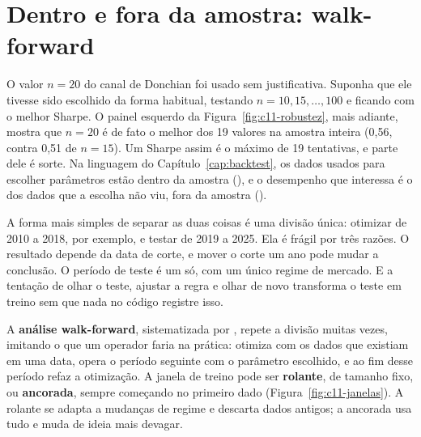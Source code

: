 \section{Dentro e fora da amostra: walk-forward}
\label{sec:c11-wf}

O valor $n = 20$ do canal de Donchian foi usado sem justificativa. Suponha que ele tivesse sido escolhido da forma habitual, testando $n = 10, 15, \dots, 100$ e ficando com o melhor Sharpe. O painel esquerdo da Figura~\ref{fig:c11-robustez}, mais adiante, mostra que $n = 20$ é de fato o melhor dos 19 valores na amostra inteira (0,56, contra 0,51 de $n = 15$). Um Sharpe assim é o máximo de 19 tentativas, e parte dele é sorte. Na linguagem do Capítulo~\ref{cap:backtest}, os dados usados para escolher parâmetros estão dentro da amostra (), e o desempenho que interessa é o dos dados que a escolha não viu, fora da amostra ().

A forma mais simples de separar as duas coisas é uma divisão única: otimizar de 2010 a 2018, por exemplo, e testar de 2019 a 2025. Ela é frágil por três razões. O resultado depende da data de corte, e mover o corte um ano pode mudar a conclusão. O período de teste é um só, com um único regime de mercado. E a tentação de olhar o teste, ajustar a regra e olhar de novo transforma o teste em treino sem que nada no código registre isso.

A \textbf{análise walk-forward}, sistematizada por \citet{pardo2008}, repete a divisão muitas vezes, imitando o que um operador faria na prática: otimiza com os dados que existiam em uma data, opera o período seguinte com o parâmetro escolhido, e ao fim desse período refaz a otimização. A janela de treino pode ser \textbf{rolante}, de tamanho fixo, ou \textbf{ancorada}, sempre começando no primeiro dado (Figura~\ref{fig:c11-janelas}). A rolante se adapta a mudanças de regime e descarta dados antigos; a ancorada usa tudo e muda de ideia mais devagar.

